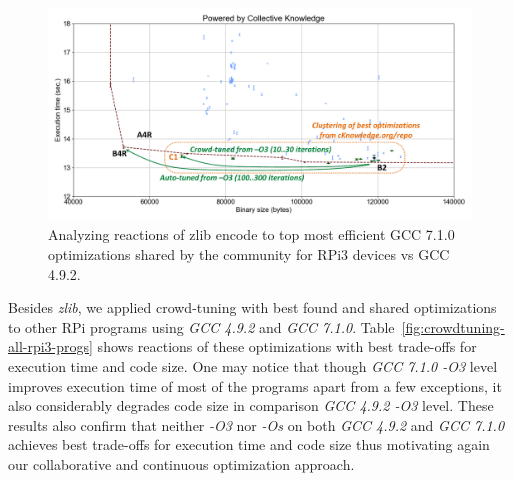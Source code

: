    \begin{figure}[!htbp]
     \centering
      \includegraphics[width=5.8in]
      {ck-assets/bae9e4979bd3bc4b-cropped.pdf} %
      \vspace{0.1in}
      \vspace{0.1in}
     \caption{
      Analyzing reactions of zlib encode to top most efficient GCC 7.1.0 optimizations shared by the community for RPi3 devices vs GCC 4.9.2.
     }
     \label{fig:autotuning-zlib-encode-gcc7-reactions}
   \end{figure}

Besides \textit{zlib}, we applied crowd-tuning with best found and shared optimizations 
to other RPi programs using \textit{GCC 4.9.2} and \textit{GCC 7.1.0}.
%
Table~\ref{fig:crowdtuning-all-rpi3-progs} shows reactions of these optimizations
with best trade-offs for execution time and code size.
%
One may notice that though \textit{GCC 7.1.0 -O3} level improves execution time
of most of the programs apart from a few exceptions, it also considerably degrades
code size in comparison \textit{GCC 4.9.2 -O3} level.
%
These results also confirm that neither \textit{-O3} nor \textit{-Os} on both 
\textit{GCC 4.9.2} and \textit{GCC 7.1.0} achieves best trade-offs for execution
time and code size thus motivating again our collaborative and continuous optimization
approach.

